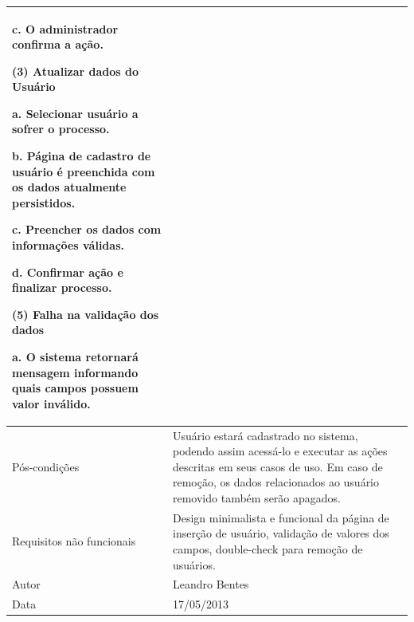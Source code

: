\begin{flushleft}
\begin{supertabular}{|m{5.5680003cm}|m{9.325cm}|}
c. O administrador confirma a ação.

(3) Atualizar dados do Usuário

a. Selecionar usuário a sofrer o processo.

b. Página de cadastro de usuário é preenchida com os dados atualmente persistidos.

c. Preencher os dados com informações válidas.

d. Confirmar ação e finalizar processo.

(5) Falha na validação dos dados

a. O sistema retornará mensagem informando quais campos possuem valor inválido.
\\\hline
Pós-condições &
Usuário estará cadastrado no sistema, podendo assim acessá-lo e executar as ações descritas em seus casos de uso. Em caso de remoção, os dados relacionados ao usuário removido também serão apagados.\\\hline
Requisitos não funcionais &
Design minimalista e funcional da página de inserção de usuário, validação de valores dos campos, double-check para remoção de usuários.\\\hline
Autor &
Leandro Bentes\\\hline
Data &
17/05/2013\\\hline
\end{supertabular}
\end{flushleft}

